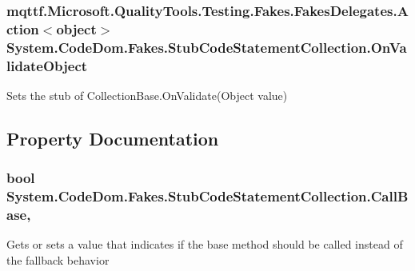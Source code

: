 \hypertarget{class_system_1_1_code_dom_1_1_fakes_1_1_stub_code_statement_collection_a1c9538c26627cd2c8cd3ae08422f8193}{
\subsubsection[{On\-Validate\-Object}]{\setlength{\rightskip}{0pt plus 5cm}mqttf.\-Microsoft.\-Quality\-Tools.\-Testing.\-Fakes.\-Fakes\-Delegates.\-Action$<$object$>$ System.\-Code\-Dom.\-Fakes.\-Stub\-Code\-Statement\-Collection.\-On\-Validate\-Object}}\label{class_system_1_1_code_dom_1_1_fakes_1_1_stub_code_statement_collection_a1c9538c26627cd2c8cd3ae08422f8193}


Sets the stub of Collection\-Base.\-On\-Validate(\-Object value)



\subsection{Property Documentation}
\hypertarget{class_system_1_1_code_dom_1_1_fakes_1_1_stub_code_statement_collection_ac37ad698efa6236cfd5c56b6c2441e98}{
\subsubsection[{Call\-Base}]{\setlength{\rightskip}{0pt plus 5cm}bool System.\-Code\-Dom.\-Fakes.\-Stub\-Code\-Statement\-Collection.\-Call\-Base\hspace{0.3cm}{\ttfamily [get]}, {\ttfamily [set]}}}\label{class_system_1_1_code_dom_1_1_fakes_1_1_stub_code_statement_collection_ac37ad698efa6236cfd5c56b6c2441e98}


Gets or sets a value that indicates if the base method should be called instead of the fallback behavior


